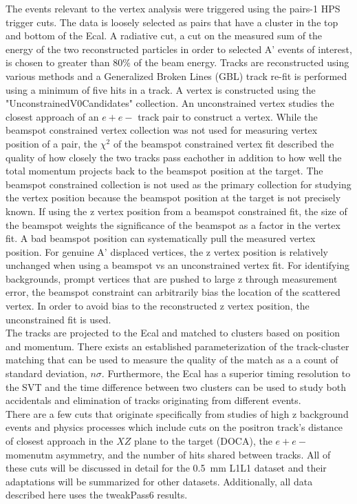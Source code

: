 The events relevant to the vertex analysis were triggered using the pairs-1 HPS trigger cuts. The data is loosely selected as pairs that have a cluster in the top and bottom of the Ecal. A radiative cut, a cut on the measured sum of the energy of the two reconstructed particles in order to selected A' events of interest, is chosen to greater than 80$\%$ of the beam energy. Tracks are reconstructed using various methods and a Generalized Broken Lines (GBL) track re-fit is performed using a minimum of five hits in a track. A vertex is constructed using the "UnconstrainedV0Candidates" collection. An unconstrained vertex studies the closest approach of an $e+e-$ track pair to construct a vertex. While the beamspot constrained vertex collection was not used for measuring vertex position of a pair, the $\chi^{2}$ of the beamspot constrained vertex fit described the quality of how closely the two tracks pass eachother in addition to how well the total momentum projects back to the beamspot position at the target. 
\indent The beamspot constrained collection is not used as the primary collection for studying the vertex position because the beamspot position at the target is not precisely known. If using the z vertex position from a beamspot constrained fit, the size of the beamspot weights the significance of the beamspot as a factor in the vertex fit. A bad beamspot position can systematically pull the measured vertex position. For genuine A' displaced vertices, the z vertex position  is relatively unchanged when using a beamspot vs an unconstrained vertex fit. For identifying backgrounds, prompt vertices that are pushed to large z through measurement error, the beamspot constraint can arbitrarily bias the location of the scattered vertex. In order to avoid bias to the reconstructed z vertex position, the unconstrained fit is used.  \\
\indent The tracks are projected to the Ecal and matched to clusters based on position and momentum. There exists an established parameterization of the track-cluster matching that can be used to measure the quality of the match as a a count of standard deviation, $n\sigma$. Furthermore, the Ecal has a superior timing resolution to the SVT and the time difference between two clusters can be used to study both accidentals and elimination of tracks originating from different events. \\
\indent There are a few cuts that originate specifically from studies of high z background events and physics processes which include cuts on the positron track's distance of closest approach in the $XZ$ plane to the target (DOCA), the $e+e-$ momenutm asymmetry, and the number of hits shared between tracks. All of these cuts will be discussed in detail for the 0.5~mm L1L1 dataset and their adaptations will be summarized for other datasets. Additionally, all data described here uses the tweakPass6 results. 
